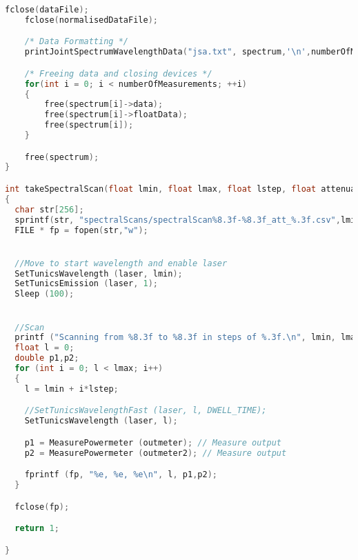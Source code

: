 \begin{lstlisting}[style=customc, language=C]
    fclose(dataFile);
    fclose(normalisedDataFile);

    /* Data Formatting */
    printJointSpectrumWavelengthData("jsa.txt", spectrum,'\n',numberOfMeasurements);

    /* Freeing data and closing devices */
    for(int i = 0; i < numberOfMeasurements; ++i)
    {
        free(spectrum[i]->data);
        free(spectrum[i]->floatData);
        free(spectrum[i]);
    }

    free(spectrum);
}

int takeSpectralScan(float lmin, float lmax, float lstep, float attenuation,PowermeterHandle outmeter,PowermeterHandle outmeter2, TunicsHandle laser)
{
  char str[256];
  sprintf(str, "spectralScans/spectralScan%8.3f-%8.3f_att_%.3f.csv",lmin,lmax,attenuation);
  FILE * fp = fopen(str,"w");


  //Move to start wavelength and enable laser
  SetTunicsWavelength (laser, lmin);
  SetTunicsEmission (laser, 1);
  Sleep (100);


  //Scan
  printf ("Scanning from %8.3f to %8.3f in steps of %.3f.\n", lmin, lmax, lstep);
  float l = 0;
  double p1,p2;
  for (int i = 0; l < lmax; i++)
  {
    l = lmin + i*lstep;

    //SetTunicsWavelengthFast (laser, l, DWELL_TIME);
    SetTunicsWavelength (laser, l);

    p1 = MeasurePowermeter (outmeter); // Measure output
    p2 = MeasurePowermeter (outmeter2); // Measure output

    fprintf (fp, "%e, %e, %e\n", l, p1,p2);
  }

  fclose(fp);

  return 1;

}
\end{lstlisting}